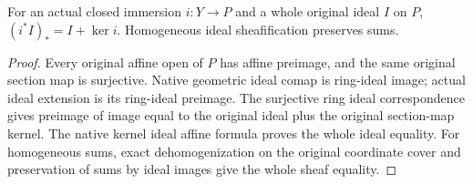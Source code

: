 \begin{lemma}
\label{lem:c0n-original-closed-extension-kernel}
\leanok
For an actual closed immersion $i:Y\to P$ and a whole original ideal $I$ on
$P$, $(i^*I)_* = I+\ker i$. Homogeneous ideal sheafification preserves sums.
\end{lemma}
\begin{proof}
Every original affine open of $P$ has affine preimage, and the same original
section map is surjective. Native geometric ideal comap is ring-ideal image;
actual ideal extension is its ring-ideal preimage. The surjective ring ideal
correspondence gives preimage of image equal to the original ideal plus the
original section-map kernel. The native kernel ideal affine formula proves
the whole ideal equality. For homogeneous sums, exact dehomogenization on
the original coordinate cover and preservation of sums by ideal images give
the whole sheaf equality.
\end{proof}

